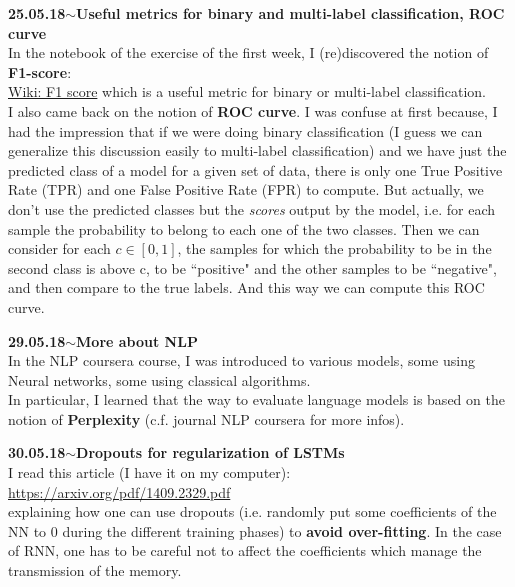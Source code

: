 \documentclass[11pt,a4paper]{article}
\newenvironment{loggentry}[2]%
{\noindent\textbf{#1}\hspace{1cm}$\mathbf{\sim}$\text{ }\textbf{#2}\\}{\vspace{0.5cm}}
\begin{document}
\begin{loggentry}{25.05.18}{Useful metrics for binary and multi-label classification, ROC curve}
In the notebook of the exercise of the first week, I (re)discovered the notion of \textbf{F1-score}:\\
\href{https://en.wikipedia.org/wiki/F1_score}{Wiki: F1 score}
which is a useful metric for binary or multi-label classification.\\
I also came back on the notion of \textbf{ROC curve}. I was confuse at first because, I had the impression that if we were doing binary classification (I guess we can generalize this discussion easily to multi-label classification) and we have just the predicted class of a model for a given set of data, there is only one True Positive Rate (TPR) and one False Positive Rate (FPR) to compute. But actually, we don't use the predicted classes but the \textit{scores} output by the model, i.e. for each sample the probability to belong to each one of the two classes. Then we can consider for each $c\in [0,1]$, the samples for which the probability to be in the second class is above c, to be ``positive" and the other samples to be ``negative", and then compare to the true labels. And this way we can compute this ROC curve.\\
\end{loggentry}

\begin{loggentry}{29.05.18}{More about NLP}
In the NLP coursera course, I was introduced to various models, some using Neural networks, some using classical algorithms.\\
In particular, I learned that the way to evaluate language models is based on the notion of \textbf{Perplexity} (c.f. journal NLP coursera for more infos).
\end{loggentry}

\begin{loggentry}{30.05.18}{Dropouts for regularization of LSTMs}
I read this article (I have it on my computer):\\
\url{https://arxiv.org/pdf/1409.2329.pdf}\\
explaining how one can use dropouts (i.e. randomly put some coefficients of the NN to 0 during the different training phases) to \textbf{avoid over-fitting}. In the case of RNN, one has to be careful not to affect the coefficients which manage the transmission of the memory.
\end{loggentry}
\end{document}

